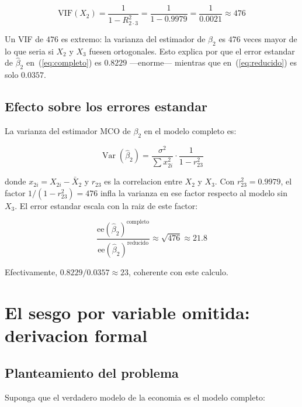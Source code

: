 \documentclass[12pt, letterpaper]{article}
\theoremstyle{remark}
\newcommand{\Var}{\operatorname{Var}}
\begin{document}
\begin{equation}
  \text{VIF}(X_2) = \frac{1}{1 - R_{2\cdot 3}^2}
                  = \frac{1}{1 - 0.9979}
                  = \frac{1}{0.0021}
                  \approx 476
  \label{eq:VIF}
\end{equation}

\noindent Un VIF de $476$ es extremo: la varianza del estimador de $\beta_2$
es $476$ veces mayor de lo que seria si $X_2$ y $X_3$ fuesen ortogonales.
Esto explica por que el error estandar de $\hat\beta_2$ en~(\ref{eq:completo})
es $0.8229$ ---enorme--- mientras que en~(\ref{eq:reducido}) es solo $0.0357$.

\subsection{Efecto sobre los errores estandar}

La varianza del estimador MCO de $\beta_2$ en el modelo completo es:

\begin{equation}
  \Var(\hat\beta_2) = \frac{\sigma^2}{\sum x_{2i}^2} \cdot \frac{1}{1 - r_{23}^2}
  \label{eq:var_beta2}
\end{equation}

\noindent donde $x_{2i} = X_{2i} - \bar X_2$ y $r_{23}$ es la correlacion entre
$X_2$ y $X_3$. Con $r_{23}^2 = 0.9979$, el factor $1/(1 - r_{23}^2) = 476$
infla la varianza en ese factor respecto al modelo sin $X_3$. El error estandar
escala con la raiz de este factor:

\begin{equation}
  \frac{\text{ee}(\hat\beta_2)^{\text{completo}}}{\text{ee}(\hat\beta_2)^{\text{reducido}}}
  \approx \sqrt{476} \approx 21.8
  \label{eq:razon_ee}
\end{equation}

\noindent Efectivamente, $0.8229 / 0.0357 \approx 23$, coherente con este calculo.

\section{El sesgo por variable omitida: derivacion formal}

\subsection{Planteamiento del problema}

Suponga que el verdadero modelo de la economia es el modelo completo:
\end{document}
